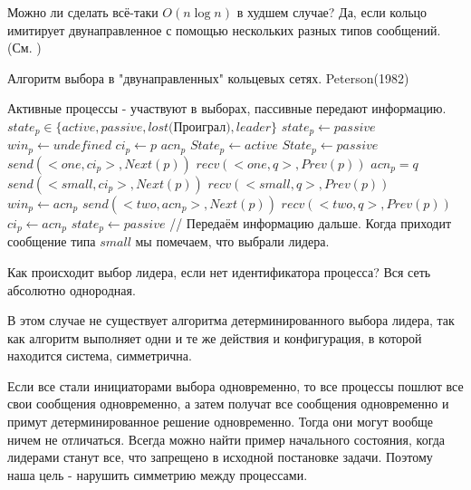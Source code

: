 Можно ли сделать всё-таки $O(n\log n)$ в худшем случае? Да, если кольцо имитирует двунаправленное с помощью нескольких разных типов сообщений. (См. )
\begin{algorithm}
\caption{Алгоритм выбора в "двунаправленных" кольцевых сетях. Peterson(1982)}
\label{algPeterson}
\begin{algorithmic}
\State Активные процессы - участвуют в выборах, пассивные передают информацию. 
\State $state_p \in \{active, passive, lost\text{(Проиграл)}, leader\}$ 
\State $state_p \gets passive$
\State $win_p \gets undefined$ 
\State $ci_p \gets p$ 
\State $acn_p$ 
    \State $State_p \gets active$
\Else 
    \State $State_p \gets passive$
\EndIf
{}
    \State $send(<one, ci_p>, Next(p))$ 
    \State $recv(<one, q>, Prev(p))$
    \State $acn_p = q$
     
        \State $send(<small, ci_p>, Next(p))$ 
        \State $recv(<small, q>, Prev(p))$ 
        \State $win_p \gets acn_p$
    \Else {}
        \State $send(<two, acn_p>, Next(p))$
        \State $recv(<two, q>, Prev(p))$
         
            \State $ci_p \gets acn_p$
        \Else 
            \State $state_p \gets passive$ 
        \EndIf
    \EndIf
\EndWhile
{} 
    \State // Передаём информацию дальше.
\EndIf
\State Когда приходит сообщение типа $small$ мы помечаем, что выбрали лидера.
\end{algorithmic}
\end{algorithm}

Как происходит выбор лидера, если нет идентификатора процесса? Вся сеть абсолютно однородная.

В этом случае не существует алгоритма детерминированного выбора лидера, так как алгоритм выполняет одни и те же действия и конфигурация, в которой находится система, симметрична.

Если все стали инициаторами выбора одновременно, то все процессы пошлют все свои сообщения одновременно, а затем получат все сообщения одновременно и примут детерминированное решение одновременно. Тогда они могут вообще ничем не отличаться. Всегда можно найти пример начального состояния, когда лидерами станут все, что запрещено в исходной постановке задачи. Поэтому наша цель - нарушить симметрию между процессами.

